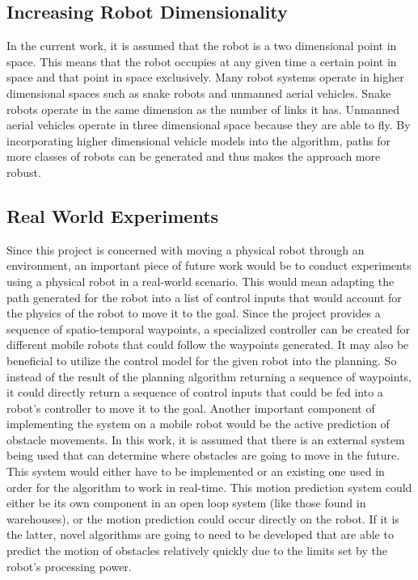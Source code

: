 \subsection{Increasing Robot Dimensionality}

In the current work, it is assumed that the robot is a two dimensional point in
space. This means that the robot occupies at any given time a certain point in
space and that point in space exclusively. Many robot systems operate in higher
dimensional spaces such as snake robots and unmanned aerial vehicles. Snake
robots operate in the same dimension as the number of links it has. Unmanned
aerial vehicles operate in three dimensional space because they are able to
fly. By incorporating higher dimensional vehicle models into the algorithm,
paths for more classes of robots can be generated and thus makes the approach
more robust.

\subsection{Real World Experiments}

Since this project is concerned with moving a physical robot through an
environment, an important piece of future work would be to conduct experiments
using a physical robot in a real-world scenario. This would mean adapting the
path generated for the robot into a list of control inputs that would account
for the physics of the robot to move it to the goal. Since the project provides
a sequence of spatio-temporal waypoints, a specialized controller can be
created for different mobile robots that could follow the waypoints generated.
It may also be beneficial to utilize the control model for the given robot into
the planning. So instead of the result of the planning algorithm returning a
sequence of waypoints, it could directly return a sequence of control inputs
that could be fed into a robot's controller to move it to the goal. Another
important component of implementing the system on a mobile robot would be the
active prediction of obstacle movements. In this work, it is assumed that there
is an external system being used that can determine where obstacles are going
to move in the future. This system would either have to be implemented or an
existing one used in order for the algorithm to work in real-time. This motion
prediction system could either be its own component in an open loop system
(like those found in warehouses), or the motion prediction could occur directly
on the robot. If it is the latter, novel algorithms are going to need to be
developed that are able to predict the motion of obstacles relatively quickly
due to the limits set by the robot's processing power.

